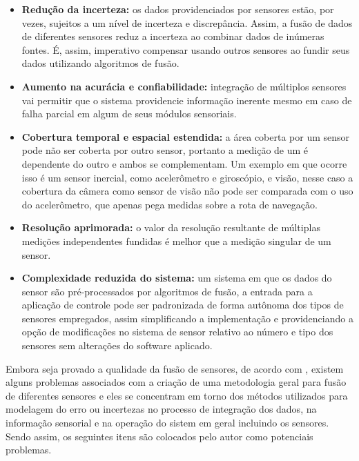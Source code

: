 \documentclass[acronym, symbols, table]{fei}
\begin{document}
			\begin{itemize}
				
				\item \textbf{Redução da incerteza:} os dados providenciados por sensores estão, por vezes, sujeitos a um nível de incerteza e discrepância. Assim, a fusão de dados de diferentes sensores reduz a incerteza ao combinar dados de inúmeras fontes. É, assim, imperativo compensar usando outros sensores ao fundir seus dados utilizando algoritmos de fusão.
				
				\item \textbf{Aumento na acurácia e confiabilidade:} integração de múltiplos sensores vai permitir que o sistema providencie informação inerente mesmo em caso de falha parcial em algum de seus módulos sensoriais.
				
				\item \textbf{Cobertura temporal e espacial estendida:} a área coberta por um sensor pode não ser coberta por outro sensor, portanto a medição de um é dependente do outro e ambos se complementam. Um exemplo em que ocorre isso é um sensor inercial, como acelerômetro e giroscópio, e visão, nesse caso a cobertura da câmera como sensor de visão não pode ser comparada com o uso do acelerômetro, que apenas pega medidas sobre a rota de navegação.
				
				\item \textbf{Resolução aprimorada:} o valor da resolução resultante de múltiplas medições independentes fundidas é melhor que a medição singular de um sensor.
				
				\item \textbf{Complexidade reduzida do sistema:} um sistema em que os dados do sensor são pré-processados por algoritmos de fusão, a entrada para a aplicação de controle pode ser padronizada de forma autônoma dos tipos de sensores empregados, assim simplificando a implementação e providenciando a opção de modificações no sistema de sensor relativo ao número e tipo dos sensores sem alterações do software aplicado.
				
			\end{itemize}
		
			Embora seja provado a qualidade da fusão de sensores, de acordo com \textcite{fung2017sensor}, existem alguns problemas associados com a criação de uma metodologia geral para fusão de diferentes sensores e eles se concentram em torno dos métodos utilizados para modelagem do erro ou incertezas no processo de integração dos dados, na informação sensorial e na operação do sistem em geral incluindo os sensores. Sendo assim, os seguintes itens são colocados pelo autor como potenciais problemas.
			
\end{document}
